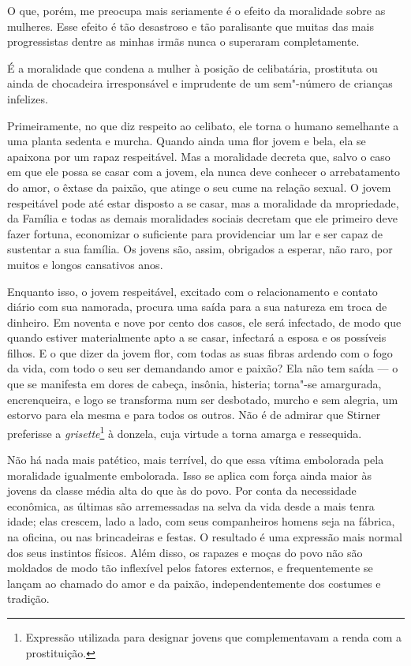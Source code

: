 
O que, porém, me preocupa mais seriamente é o efeito da moralidade sobre
as mulheres. Esse efeito é tão desastroso e tão paralisante que muitas
das mais progressistas dentre as minhas irmãs nunca o superaram
completamente.

É a moralidade que condena a mulher à posição de celibatária, prostituta
ou ainda de chocadeira irresponsável e imprudente de um sem"-número de
crianças infelizes.

Primeiramente, no que diz respeito ao celibato, ele torna o humano
semelhante a uma planta sedenta e murcha. Quando ainda uma flor jovem e
bela, ela se apaixona por um rapaz respeitável. Mas a moralidade decreta
que, salvo o caso em que ele possa se casar com a jovem, ela nunca deve
conhecer o arrebatamento do amor, o êxtase da paixão, que atinge o seu
cume na relação sexual. O jovem respeitável pode até estar disposto a se
casar, mas a moralidade da mropriedade, da Família e todas as demais
moralidades sociais decretam que ele primeiro deve fazer fortuna,
economizar o suficiente para providenciar um lar e ser capaz de
sustentar a sua família. Os jovens são, assim, obrigados a esperar, não
raro, por muitos e longos cansativos anos.

Enquanto isso, o jovem respeitável, excitado com o relacionamento e
contato diário com sua namorada, procura uma saída para a sua natureza em
troca de dinheiro. Em noventa e nove por cento dos casos, ele será
infectado, de modo que quando estiver materialmente apto a se casar,
infectará a esposa e os possíveis filhos. E o que dizer da jovem flor,
com todas as suas fibras ardendo com o fogo da vida, com todo o seu ser
demandando amor e paixão? Ela não tem saída --- o que se manifesta em
dores de cabeça, insônia, histeria; torna"-se amargurada, encrenqueira, e
logo se transforma num ser desbotado, murcho e sem alegria, um estorvo
para ela mesma e para todos os outros. Não é de admirar que Stirner
preferisse a \emph{grisette}\footnote{Expressão utilizada para designar
  jovens que complementavam a renda com a prostituição.} à donzela, cuja
virtude a torna amarga e ressequida.

Não há nada mais patético, mais terrível, do que essa vítima embolorada
pela moralidade igualmente embolorada. Isso se aplica com força ainda
maior às jovens da classe média alta do que às do povo. Por conta da
necessidade econômica, as últimas são arremessadas na selva da vida
desde a mais tenra idade; elas crescem, lado a lado, com seus
companheiros homens seja na fábrica, na oficina, ou nas brincadeiras e
festas. O resultado é uma expressão mais normal dos seus instintos
físicos. Além disso, os rapazes e moças do povo não são moldados de modo\label{tradicao}
tão inflexível pelos fatores externos, e frequentemente se lançam ao
chamado do amor e da paixão, independentemente dos costumes e tradição.

